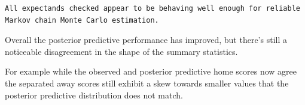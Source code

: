 \documentclass[
  letterpaper,
  DIV=11,
  numbers=noendperiod]{scrartcl}
\newenvironment{Shaded}{\begin{snugshade}}{\end{snugshade}}
\newcommand{\AttributeTok}[1]{\textcolor[rgb]{0.40,0.45,0.13}{#1}}
\newcommand{\ConstantTok}[1]{\textcolor[rgb]{0.56,0.35,0.01}{#1}}
\newcommand{\FunctionTok}[1]{\textcolor[rgb]{0.28,0.35,0.67}{#1}}
\newcommand{\NormalTok}[1]{\textcolor[rgb]{0.00,0.23,0.31}{#1}}
\newcommand{\OtherTok}[1]{\textcolor[rgb]{0.00,0.23,0.31}{#1}}
\newcommand{\SpecialCharTok}[1]{\textcolor[rgb]{0.37,0.37,0.37}{#1}}
\newcommand{\StringTok}[1]{\textcolor[rgb]{0.13,0.47,0.30}{#1}}
\begin{document}
\begin{Shaded}
\end{Shaded}

\begin{verbatim}
All expectands checked appear to be behaving well enough for reliable
Markov chain Monte Carlo estimation.
\end{verbatim}

Overall the posterior predictive performance has improved, but there's
still a noticeable disagreement in the shape of the summary statistics.

For example while the observed and posterior predictive home scores now
agree the separated away scores still exhibit a skew towards smaller
values that the posterior predictive distribution does not match.
\end{document}

